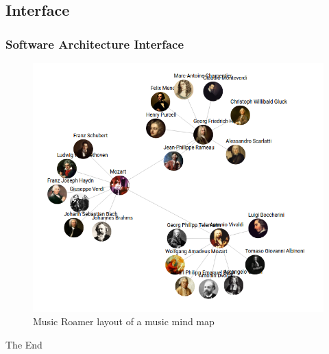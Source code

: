 \documentclass{beamer}
\begin{document}
	\subsection{Interface}
		\begin{frame}
		\frametitle{Software Architecture Interface}
			\begin{figure}
				\includegraphics[scale=0.3]{musicroamer.png}
				\caption{Music Roamer layout of a music mind map}
			\end{figure}
		\end{frame}

\begin{frame}
	\Huge{\centerline{The End}}
\end{frame}
\end{document}

